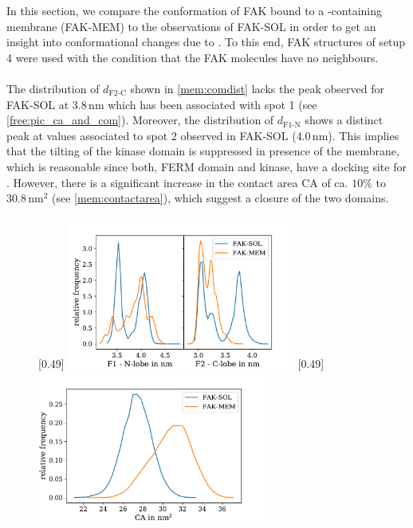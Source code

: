 \label{membrane:chapter}
In this section, we compare the conformation of FAK bound to a \pip{}-containing membrane (FAK-MEM) to the observations of FAK-SOL in order to get an insight into conformational changes due to \pip{}. To this end, FAK structures of setup 4 were used with the condition that the FAK molecules have no neighbours.\\
\\
The distribution of $d_\text{F2-C}$ shown in \autoref{mem:comdist} lacks the peak observed for FAK-SOL at $3.8\,\si{\nano\metre}$ which has been associated with spot 1 (see \autoref{free:pic_ca_and_com}). Moreover, the distribution of $d_\text{F1-N}$ shows a distinct peak at values associated to spot 2 observed in FAK-SOL ($4.0\,\si{\nano\metre}$). This implies that the tilting of the kinase domain is suppressed in presence of the membrane, which is reasonable since both, FERM domain and kinase, have a docking site for \pip{}. However, there is a significant increase in the contact area CA of ca. $10\%$ to $30.8\,\si{\nano\metre}^2$ (see \autoref{mem:contactarea}), which suggest a closure of the two domains.\\
%
%
%
\begin{figure}[hb]
	\subcaptionbox{\label{mem:comdist}}[0.49\textwidth]{
		\includegraphics[height=5cm]{figures/results/comp_free_mem_comdist}
	}\hfill%
	\subcaptionbox{\label{mem:contactarea}}[0.49\textwidth]{
		\includegraphics[height=5cm]{figures/results/ca_sol_mem}
	}%
\end{figure}
